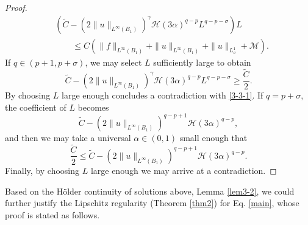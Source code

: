 \documentclass[11pt,reqno]{amsart}
\numberwithin{equation}{section}
\begin{document}
\begin{proof}
\begin{equation}
\begin{split}
&(\widetilde{C}-(2\|u\|_{L^\infty(B_1)})^\gamma\mathcal{H}(3\alpha )^{q-p}L^{q-p-\sigma})L\\
&\qquad\le C(\|f\|_{L^\infty(B_1)}+\|u\|_{L^\infty(B_1)}+\|u\|_{L^1_\sigma}+\mathcal{M}).
\end{split}
\end{equation}
If $q\in(p+1,p+\sigma)$, we may select $L$ sufficiently large to obtain
$$
\widetilde{C}-(2\|u\|_{L^\infty(B_1)})^\gamma\mathcal{H}(3\alpha )^{q-p}L^{q-p-\sigma}\ge\frac{\widetilde{C}}{2}.
$$
By choosing $L$ large enough concludes a contradiction with \eqref{3-3-1}.
If $q=p+\sigma$, the coefficient of $L$ becomes
$$
\widetilde{C}-(2\|u\|_{L^\infty(B_1)})^{q-p+1}\mathcal{H}(3\alpha )^{q-p},
$$
and then we may take a universal $\alpha\in(0,1)$ small enough that
$$
\frac{\widetilde{C}}{2}\le\widetilde{C}-(2\|u\|_{L^\infty(B_1)})^{q-p+1}\mathcal{H}(3\alpha )^{q-p}.
$$
Finally, by choosing $L$ large enough we may arrive at a contradiction.
\end{proof}

Based on the H\"{o}lder continuity of solutions above, Lemma \ref{lem3-2}, we could further justify the Lipschitz regularity (Theorem \ref{thm2}) for Eq. \eqref{main}, whose proof is stated as follows.
\end{document}
